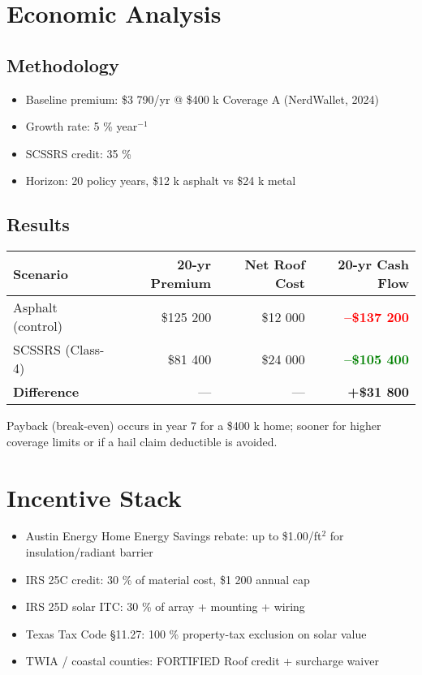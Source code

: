 \documentclass[11pt]{article}
\begin{document}
\section{Economic Analysis}

\subsection{Methodology}
\begin{itemize}
    \item Baseline premium: \$3 790/yr @ \$400 k Coverage A (NerdWallet, 2024)
    \item Growth rate: 5 \% year$^{-1}$
    \item SCSSRS credit: 35 \%
    \item Horizon: 20 policy years, \$12 k asphalt vs \$24 k metal
\end{itemize}

\subsection{Results}

\begin{table}[h]
\centering
\begin{tabular}{@{}lrrr@{}}
\toprule
\textbf{Scenario} & \textbf{20-yr Premium} & \textbf{Net Roof Cost} &
\textbf{20-yr Cash Flow} \\ \midrule
Asphalt (control) & \$125 200 & \$12 000 & \textcolor{red}{\textbf{–\$137 200}} \\
SCSSRS (Class-4)  & \$81 400  & \$24 000 & \textcolor{green}{\textbf{–\$105 400}} \\ \midrule
\textbf{Difference} & — & — & \textbf{+\$31 800} \\ \bottomrule
\end{tabular}
\end{table}

\noindent
Payback (break-even) occurs in year 7 for a \$400 k home; sooner for
higher coverage limits or if a hail claim deductible is avoided.

\section{Incentive Stack}

\begin{itemize}
    \item Austin Energy Home Energy Savings rebate:
          up to \$1.00/ft$^{2}$ for insulation/radiant barrier
    \item IRS 25C credit: 30 \% of material cost, \$1 200 annual cap
    \item IRS 25D solar ITC: 30 \% of array + mounting + wiring
    \item Texas Tax Code §11.27: 100 \% property-tax exclusion on solar value
    \item TWIA / coastal counties: FORTIFIED Roof credit + surcharge waiver
\end{itemize}
\end{document}

